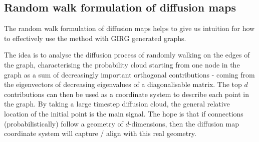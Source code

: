 


\subsection{Random walk formulation of diffusion maps}
\label{sec:diff_maps_theory}
The random walk formulation of diffusion maps helps to give us intuition for how to effectively use the method with GIRG generated graphs.

The idea is to analyse the diffusion process of randomly walking on the edges of the graph, characterising the probability cloud starting from one node in the graph as a sum of decreasingly important orthogonal contributions - coming from the eigenvectors of decreasing eigenvalues of a diagonalisable matrix.
The top $d$ contributions can then be used as a coordinate system to describe each point in the graph. By taking a large timestep diffusion cloud, the general relative location of the initial point is the main signal. The hope is that if connections (probabilistically) follow a geometry of $d$-dimensions, then the diffusion map coordinate system will capture / align with this real geometry.

